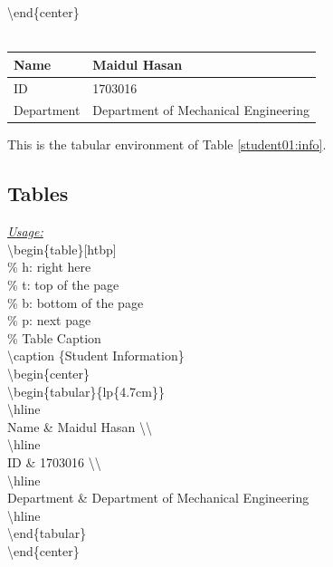\documentclass[12pt, twocolumn]{article}
\begin{document}
\noindent \textbackslash end\{center\} \\ \\
  
\begin{center} \big\Downarrow \end{center}
 
 \begin{center}
  
 \begin{tabular}{|l|p{4.7cm}|}
  \hline
  Name & Maidul Hasan \\
  \hline
  ID & 1703016 \\
  \hline
  Department & Department of Mechanical Engineering \\
  \hline
 \end{tabular}
 
 \end{center}

This is the tabular environment of Table \ref{student01:info}.
 

 \subsection{Tables}
 
 \underline{\textit{Usage:}} \\

\noindent \textbackslash begin\{table\}[htbp] \\

 \noindent \% h: right here \\
 \% t: top of the page \\
 \% b: bottom of the page \\
 \% p: next page \\

\noindent \% Table Caption \\
\textbackslash caption \{Student Information\} \\

 \noindent \textbackslash begin\{center\} \\
 \textbackslash begin\{tabular\}\{\textbar l\textbar p\{4.7cm\}\textbar\} \\
 \hspace*{6mm} \textbackslash hline \\
  \hspace*{6mm} Name \& Maidul Hasan \textbackslash \textbackslash \\
  \hspace*{6mm} \textbackslash hline \\
  \hspace*{6mm} ID \& 1703016 \textbackslash \textbackslash \\
  \hspace*{6mm} \textbackslash hline \\
  \hspace*{6mm} Department \& Department of Mechanical Engineering \\
  \hspace*{6mm} \textbackslash hline \\
  \textbackslash end\{tabular\} \\
 \noindent \textbackslash end\{center\} \\
\end{document}
